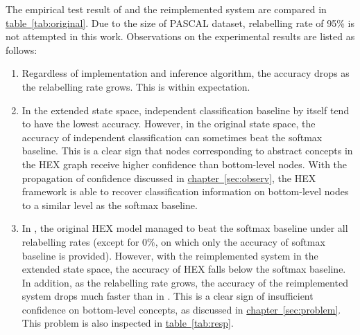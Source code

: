 \documentclass[11pt,a4paper]{book}
\begin{document}
The empirical test result of \cite{deng2014large} and the reimplemented system are compared in \hyperref[tab:original]{table~\ref{tab:original}}. Due to the size of PASCAL dataset, relabelling rate of 95\% is not attempted in this work. Observations on the experimental results are listed as follows:
\begin{enumerate}
\item Regardless of implementation and inference algorithm, the accuracy drops as the relabelling rate grows. This is within expectation.
\item In the extended state space, independent classification baseline by itself tend to have the lowest accuracy. However, in the original state space, the accuracy of independent classification can sometimes beat the softmax baseline. This is a clear sign that nodes corresponding to abstract concepts in the HEX graph receive higher confidence than bottom-level nodes. With the propagation of confidence discussed in \hyperref[sec:observ]{chapter~\ref{sec:observ}}, the HEX framework is able to recover classification information on bottom-level nodes to a similar level as the softmax baseline.
\item In \cite{deng2014large}, the original HEX model managed to beat the softmax baseline under all relabelling rates (except for 0\%, on which only the accuracy of softmax baseline is provided). However, with the reimplemented system in the extended state space, the accuracy of HEX falls below the softmax baseline. In addition, as the relabelling rate grows, the accuracy of the reimplemented system drops much faster than in \cite{deng2014large}. This is a clear sign of insufficient confidence on bottom-level concepts, as discussed in \hyperref[sec:problem]{chapter~\ref{sec:problem}}. This problem is also inspected in \hyperref[tab:resp]{table~\ref{tab:resp}}.
\end{enumerate}
\end{document}
